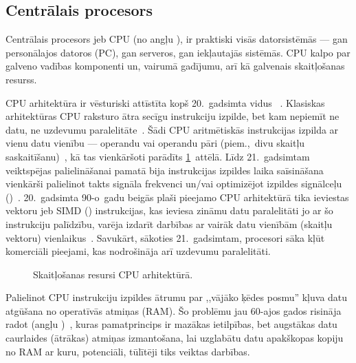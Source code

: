 \subsection{Centrālais procesors} \label{sec:cpu}
Centrālais procesors jeb CPU (no angļu ), ir
praktiski visās datorsistēmās --- gan personālajos datoros (PC), gan serveros,
gan iekļautajās sistēmās. CPU kalpo par galveno vadības komponenti un, vairumā
gadījumu, arī kā galvenais skaitļošanas resurss.

CPU arhitektūra ir vēsturiski attīstīta kopš 20.~gadsimta vidus~%
\cite{Flynn-arch}\cite{von-Neumann}.
Klasiskas arhitektūras CPU raksturo ātra secīgu instrukciju izpilde, 
bet kam nepiemīt ne datu, ne uzdevumu paralelitāte~\cite{Owens-GPU}.
Šādi CPU aritmētiskās instrukcijas izpilda ar vienu datu vienību --- 
operandu vai operandu pāri (piem.,~divu skaitļu saskaitīšanu)~\cite{Flynn-arch},
kā tas vienkāršoti parādīts \ref{fig:cpu-arch}~attēlā.
Līdz 21.~gadsimtam veiktspējas palielināšanai pamatā bija 
instrukcijas izpildes laika saīsināšana vienkārši 
palielinot takts signāla frekvenci
un/vai optimizējot izpildes signālceļu ()~\cite{Flynn-arch}.
20.~gadsimta 90-o~gadu beigās plaši pieejamo CPU arhitektūrā tika ieviestas
vektoru jeb SIMD () 
instrukcijas, kas ieviesa zināmu datu paralelitāti jo ar šo instrukciju
palīdzību, varēja izdarīt darbības ar vairāk datu vienībām (skaitļu vektoru)
vienlaikus~\cite{SIMD}.
Savukārt, sākoties 21.~gadsimtam,  procesori
sāka kļūt komerciāli pieejami, kas nodrošināja arī uzdevumu paralelitāti.

\begin{figure}[tbh]
	\centering
	\def\svgscale{1.2}
	{}
	\caption{Skaitļošanas resursi CPU arhitektūrā.}
	\label{fig:cpu-arch}
\end{figure}

Palielinot CPU instrukciju izpildes ātrumu par
,,vājāko ķēdes posmu'' kļuva datu atgūšana no operatīvās atmiņas (RAM).
Šo problēmu jau 60-ajos gados risināja radot
 (angļu )~\cite[473.~lpp.]{Patterson},
kuras pamatprincips ir
mazākas ietilpības, bet augstākas datu caurlaides (ātrākas)
atmiņas izmantošana, lai uzglabātu datu apakškopas kopiju no
RAM ar kuru, potenciāli, tūlītēji tiks veiktas darbības.
\cite{Flynn-arch}\cite{Patterson2}\cite{Patterson}\cite{Cache}

